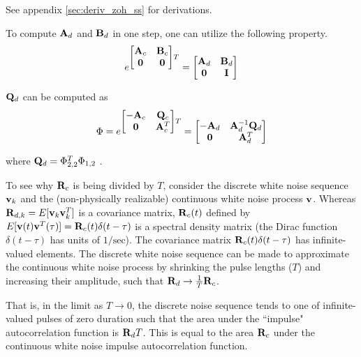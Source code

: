 See appendix \ref{sec:deriv_zoh_ss} for derivations.

To compute $\mathbf{A}_d$ and $\mathbf{B}_d$ in one step, one can utilize the
following property.
\begin{equation*}
  e^{
  \begin{bmatrix}
    \mathbf{A}_c & \mathbf{B}_c \\
    \mathbf{0} & \mathbf{0}
  \end{bmatrix}T} =
  \begin{bmatrix}
    \mathbf{A}_d & \mathbf{B}_d \\
    \mathbf{0} & \mathbf{I}
  \end{bmatrix}
\end{equation*}

$\mathbf{Q}_d$ can be computed as
\begin{equation*}
  \Phi = e^{
  \begin{bmatrix}
    -\mathbf{A}_c & \mathbf{Q}_c \\
    \mathbf{0} & \mathbf{A}_c^T
  \end{bmatrix}T} =
  \begin{bmatrix}
    -\mathbf{A}_d & \mathbf{A}_d^{-1} \mathbf{Q}_d \\
    \mathbf{0} & \mathbf{A}_d^T
  \end{bmatrix}
\end{equation*}

where $\mathbf{Q}_d = \Phi_{2,2}^T \Phi_{1,2}$ \cite{bib:integral_matrix_exp}.

To see why $\mathbf{R}_c$ is being divided by $T$, consider the discrete white
noise sequence $\mathbf{v}_k$ and the (non-physically realizable) continuous white
noise process $\mathbf{v}$. Whereas $\mathbf{R}_{d,k} = E[\mathbf{v}_k \mathbf{v}_k^T]$ is a
covariance matrix, $\mathbf{R}_c(t)$ defined by
$E[\mathbf{v}(t) \mathbf{v}^T(\tau)] = \mathbf{R}_c(t)\delta(t - \tau)$ is a spectral
density matrix (the Dirac function $\delta(t - \tau)$ has units of
$1/\text{sec}$). The covariance matrix $\mathbf{R}_c(t)\delta(t - \tau)$ has
infinite-valued elements. The discrete white noise sequence can be made to
approximate the continuous white noise process by shrinking the pulse lengths
($T$) and increasing their amplitude, such that
$\mathbf{R}_d \rightarrow \frac{1}{T}\mathbf{R}_c$.

That is, in the limit as $T \rightarrow 0$, the discrete noise sequence tends to
one of infinite-valued pulses of zero duration such that the area under the
``impulse" autocorrelation function is $\mathbf{R}_d T$. This is equal to the area
$\mathbf{R}_c$ under the continuous white noise impulse autocorrelation function.
